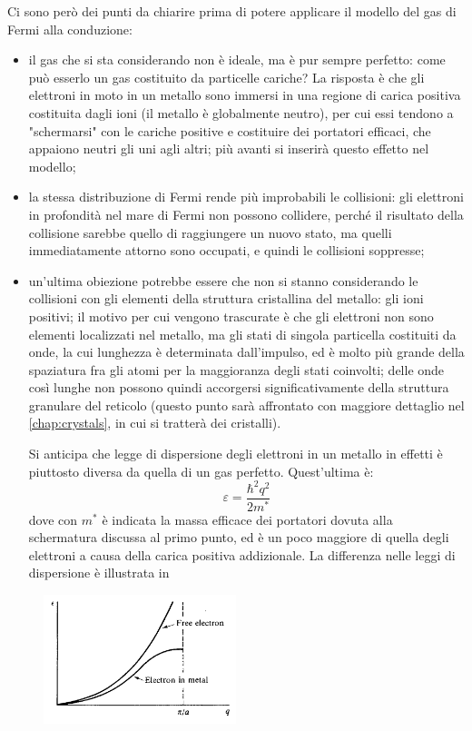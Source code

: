 Ci sono però dei punti da chiarire prima di potere applicare il modello del gas di Fermi alla conduzione:
\begin{itemize}
	\item il gas che si sta considerando non è ideale, ma è pur sempre perfetto: come può esserlo un gas costituito da particelle cariche? La risposta è che gli elettroni in moto in un metallo sono immersi in una regione di carica positiva costituita dagli ioni (il metallo è globalmente neutro), per cui essi tendono a "schermarsi" con le cariche positive e costituire dei portatori efficaci, che appaiono neutri gli uni agli altri; più avanti si inserirà questo effetto nel modello;
	\item la stessa distribuzione di Fermi rende più improbabili le collisioni: gli elettroni in profondità nel mare di Fermi non possono collidere, perché il risultato della collisione sarebbe quello di raggiungere un nuovo stato, ma quelli immediatamente attorno sono occupati, e quindi le collisioni soppresse;
	\item un'ultima obiezione potrebbe essere che non si stanno considerando le collisioni con gli elementi della struttura cristallina del metallo: gli ioni positivi; il motivo per cui vengono trascurate è che gli elettroni non sono elementi localizzati nel metallo, ma gli stati di singola particella costituiti da onde, la cui lunghezza è determinata dall'impulso, ed è molto più grande della spaziatura fra gli atomi per la maggioranza degli stati coinvolti; delle onde così lunghe non possono quindi accorgersi significativamente della struttura granulare del reticolo (questo punto sarà affrontato con maggiore dettaglio nel \cref{chap:crystals}, in cui si tratterà dei cristalli).
	
	Si anticipa che legge di dispersione degli elettroni in un metallo in effetti è piuttosto diversa da quella di un gas perfetto. Quest'ultima è:
	\begin{equation*}
	\varepsilon = \frac{\hbar^2 q^2}{2 m^\ast}
	\end{equation*}
	dove con $m^\ast$ è indicata la massa efficace dei portatori dovuta alla schermatura discussa al primo punto, ed è un poco maggiore di quella degli elettroni a causa della carica positiva addizionale.
	La differenza nelle leggi di dispersione è illustrata in 
\end{itemize}

\begin{figure}[t]
\centering
\includegraphics[width=0.5\textwidth]{Immagini/ElectronsDispersion.png}
\caption{}
\label{fig:elecdisp}
\end{figure}

